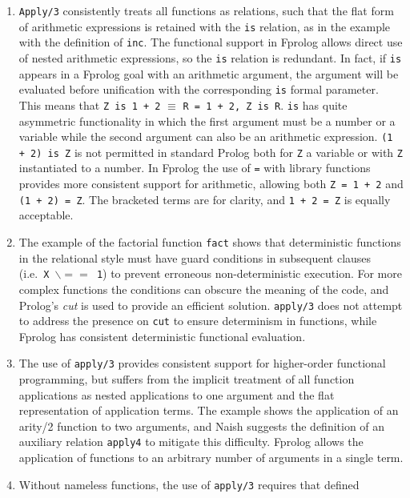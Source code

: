 \documentclass[a4paper,11pt,twoside]{article}
\begin{document}
\begin{enumerate}
\item{\texttt{Apply/3} consistently treats all functions as relations, such
  that the flat form of arithmetic expressions is retained with the \texttt{is}
  relation, as in the example with the definition of \texttt{inc}.  The functional
  support in Fprolog allows direct use of nested arithmetic expressions, so the
  \texttt{is} relation is redundant.  In fact, if \texttt{is} appears in a
  Fprolog goal with an arithmetic argument, the argument will be evaluated before
  unification with the corresponding \texttt{is} formal parameter.  This means that
  \texttt{Z is 1 + 2} $\equiv$ \texttt{R = 1 + 2, Z is R}.  \texttt{is}
  has quite asymmetric functionality
  in which the first argument must be a number or a variable while
  the second argument can also be an arithmetic expression.
  \texttt{(1 + 2) is Z} is not permitted in standard Prolog both for
  \texttt{Z} a variable or with \texttt{Z} instantiated to a number.  In Fprolog the
  use of \texttt{=} with library functions provides more consistent support for
  arithmetic,  allowing both \texttt{Z = 1 + 2} and \texttt{(1 + 2) = Z}.  The
  bracketed terms are for clarity, and \texttt{1 + 2 = Z} is equally acceptable.}
\item{The example of the factorial function \texttt{fact} shows that deterministic
  functions in the relational style must have guard conditions in subsequent clauses
  (i.e.\ \texttt{X $\backslash = =$\ 1}) to prevent erroneous non-deterministic execution.
  For more complex functions the conditions can obscure the meaning of the code, and
  Prolog's \textit{cut} is used to provide an efficient solution.  \texttt{apply/3}
  does not attempt to address the presence on \texttt{cut} to ensure determinism
  in functions, while Fprolog has consistent deterministic functional evaluation.}
\item{The use of \texttt{apply/3} provides consistent support for higher-order
  functional programming, but suffers from the implicit treatment of all function
  applications as nested applications to one argument and the flat representation of
  application terms.  The example shows the application of an arity/2 function to
  two arguments, and Naish \cite{Nai96} suggests the definition of an auxiliary
  relation \texttt{apply4} to mitigate this difficulty.  Fprolog allows the
  application of functions to an arbitrary number of arguments in a single term.}
\item{Without nameless functions, the use of \texttt{apply/3} requires that defined
}
\end{enumerate}
\end{document}
